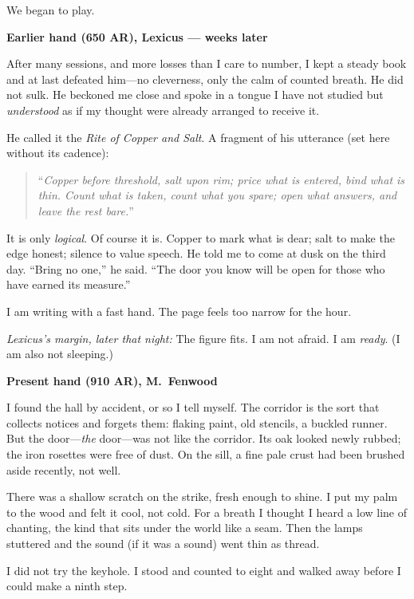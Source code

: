 \documentclass[11pt]{article}
\begin{document}
We began to play.

\medskip
\noindent\textbf{Earlier hand (650 AR), Lexicus — weeks later}

After many sessions, and more losses than I care to number, I kept a steady book and at last defeated him—no cleverness, only the calm of counted breath. He did not sulk. He beckoned me close and spoke in a tongue I have not studied but \emph{understood} as if my thought were already arranged to receive it.

He called it the \textit{Rite of Copper and Salt}. A fragment of his utterance (set here without its cadence):

\begin{quote}\small
“\textit{Copper before threshold, salt upon rim; price what is entered, bind what is thin. Count what is taken, count what you spare; open what answers, and leave the rest bare.}”
\end{quote}

It is only \emph{logical}. Of course it is. Copper to mark what is dear; salt to make the edge honest; silence to value speech. He told me to come at dusk on the third day. “Bring no one,” he said. “The door you know will be open for those who have earned its measure.”

I am writing with a fast hand. The page feels too narrow for the hour.

\medskip
\noindent\textit{Lexicus’s margin, later that night:} The figure fits. I am not afraid. I am \emph{ready}. (I am also not sleeping.)

\medskip
\noindent\textbf{Present hand (910 AR), M.\ Fenwood}

I found the hall by accident, or so I tell myself. The corridor is the sort that collects notices and forgets them: flaking paint, old stencils, a buckled runner. But the door—\emph{the} door—was not like the corridor. Its oak looked newly rubbed; the iron rosettes were free of dust. On the sill, a fine pale crust had been brushed aside recently, not well.

There was a shallow scratch on the strike, fresh enough to shine. I put my palm to the wood and felt it cool, not cold. For a breath I thought I heard a low line of chanting, the kind that sits under the world like a seam. Then the lamps stuttered and the sound (if it was a sound) went thin as thread.

I did not try the keyhole. I stood and counted to eight and walked away before I could make a ninth step.
\end{document}
